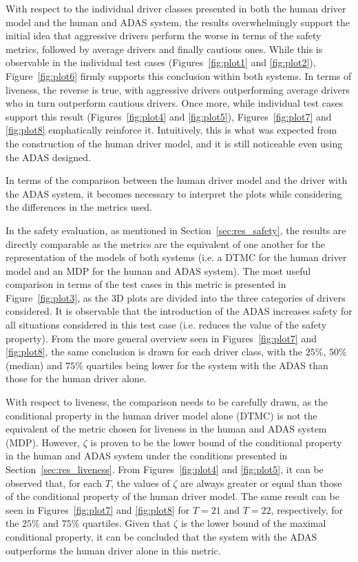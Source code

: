 With respect to the individual driver classes presented in both the human driver model and the human and ADAS system, the results overwhelmingly support the initial idea that aggressive drivers perform the worse in terms of the safety metrics, followed by average drivers and finally cautious ones. While this is observable in the individual test cases (Figures~\ref{fig:plot1} and \ref{fig:plot2}), Figure~\ref{fig:plot6} firmly supports this conclusion within both systems. In terms of liveness, the reverse is true, with aggressive drivers outperforming average drivers who in turn outperform cautious drivers. Once more, while individual test cases support this result (Figures~\ref{fig:plot4} and \ref{fig:plot5}), Figures~\ref{fig:plot7} and \ref{fig:plot8} emphatically reinforce it. Intuitively, this is what was expected from the construction of the human driver model, and it is still noticeable even using the ADAS designed.

In terms of the comparison between the human driver model and the driver with the ADAS system, it becomes necessary to interpret the plots while considering the differences in the metrics used. 

In the safety evaluation, as mentioned in Section~\ref{sec:res_safety}, the results are directly comparable as the metrics are the equivalent of one another for the representation of the models of both systems (i.e. a DTMC for the human driver model and an MDP for the human and ADAS system). The most useful comparison in terms of the test cases in this metric is presented in Figure~\ref{fig:plot3}, as the 3D plots are divided into the three categories of drivers considered. It is observable that the introduction of the ADAS increases safety for all situations considered in this test case (i.e. reduces the value of the safety property). From the more general overview seen in Figures~\ref{fig:plot7} and \ref{fig:plot8}, the same conclusion is drawn for each driver class, with the $25\%$, $50\%$ (median) and $75\%$ quartiles being lower for the system with the ADAS than those for the human driver alone. 

With respect to liveness, the comparison needs to be carefully drawn, as the conditional property in the human driver model alone (DTMC) is not the equivalent of the metric chosen for liveness in the human and ADAS system (MDP). However, $\zeta$ is proven to be the lower bound of the conditional property in the human and ADAS system under the conditions presented in Section~\ref{sec:res_liveness}. From Figures~\ref{fig:plot4} and \ref{fig:plot5}, it can be observed that, for each $T$, the values of $\zeta$ are always greater or equal than those of the conditional property of the human driver model. The same result can be seen in Figures~\ref{fig:plot7} and \ref{fig:plot8} for $T=21$ and $T=22$, respectively, for the $25\%$ and $75\%$ quartiles. Given that $\zeta$ is the lower bound of the maximal conditional property, it can be concluded that the system with the ADAS outperforms the human driver alone in this metric. 

